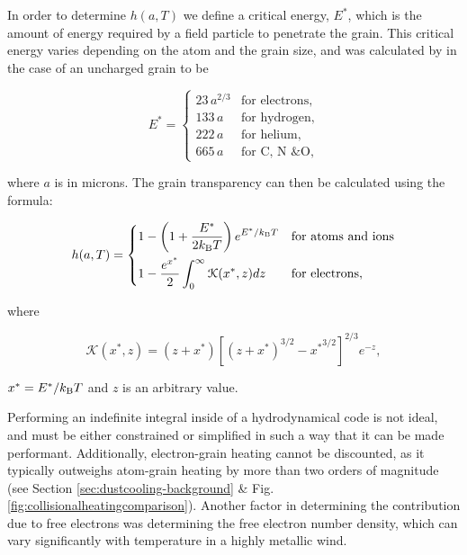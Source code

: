 In order to determine $h(a,T)$ we define a critical energy, $E^*$, which is the amount of energy required by a field particle to penetrate the grain. 
This critical energy varies depending on the atom and the grain size, and was calculated by \textcite{dwek_infrared_1981} in the case of an uncharged grain to be

\begin{equation}
  E^* =
  \begin{cases}
    23  \, a^{2/3} & \text{for electrons} , \\
    133 \, a & \text{for hydrogen} , \\
    222 \, a & \text{for helium} , \\
    665 \, a & \text{for C, N \& O} ,
  \end{cases}
\end{equation}

\noindent
where $a$ is in microns.
The grain transparency can then be calculated using the formula:

\begin{equation}
  \label{eq:heintegral}
  h(a,T) =
  \begin{dcases}
    1 - \left(1 + \frac{E^*}{2k_\text{B} T}\right) e^{E^*/k_\text{B}T} & \text{for atoms and ions}\\
    1 - \frac{e^{x^*}}{2} \int^\infty_0 \mathcal{K}(x^*,z) dz & \text{for electrons} , 
  \end{dcases}
\end{equation}

\noindent
where

\begin{equation}
  \mathcal{K}(x^*,z) = (z + x^*) \left[ (z + x^*)^{3/2} - {x^*}^{3/2} \right]^{2/3} e^{-z} , 
\end{equation}

\noindent
$x^* = E^* / k_\text{B} T$ and $z$ is an arbitrary value.

Performing an indefinite integral inside of a hydrodynamical code is not ideal, and must be either constrained or simplified in such a way that it can be made performant.
Additionally, electron-grain heating cannot be discounted, as it typically outweighs atom-grain heating by more than two orders of magnitude (see Section \ref{sec:dustcooling-background} \& Fig. \ref{fig:collisionalheatingcomparison}).
Another factor in determining the contribution due to free electrons was determining the free electron number density, which can vary significantly with temperature in a highly metallic wind.

